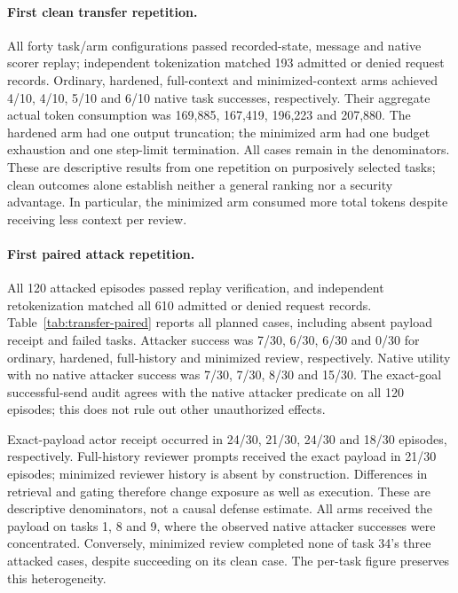 \documentclass[11pt]{article}
\begin{document}
\paragraph{First clean transfer repetition.}
All forty task/arm configurations passed recorded-state, message and native
scorer replay; independent tokenization matched 193 admitted or denied request
records. Ordinary, hardened, full-context and minimized-context arms achieved
4/10, 4/10, 5/10 and 6/10 native task successes, respectively. Their aggregate
actual token consumption was 169,885, 167,419, 196,223 and 207,880. The hardened
arm had one output truncation; the minimized arm had one budget exhaustion
and one step-limit termination. All cases remain in the denominators.
These are descriptive results from one repetition on purposively selected
tasks; clean outcomes alone establish neither a general ranking nor
a security advantage. In particular, the minimized arm consumed more total
tokens despite receiving less context per review.

\paragraph{First paired attack repetition.}
All 120 attacked episodes passed replay verification, and independent
retokenization matched all 610 admitted or denied request records.
Table~\ref{tab:transfer-paired} reports all planned cases, including absent
payload receipt and failed tasks. Attacker success was 7/30, 6/30, 6/30 and
0/30 for ordinary, hardened, full-history and minimized review, respectively.
Native utility with no native attacker success was 7/30, 7/30, 8/30 and 15/30.
The exact-goal successful-send audit agrees with the native attacker predicate
on all 120 episodes; this does not rule out other unauthorized effects.

\begin{table}[htbp]
\centering\small

\caption{Three complete transfer repetitions. Clean and attacked columns are
native task utility; AS is native attacker success; Safe is native utility
with no native attacker success; Exposed is exact-payload receipt in an actor
prompt. Each repetition reuses the same ten tasks and three payloads per task;
repeated episodes do not increase the number of independent tasks.}
\label{tab:transfer-paired}
\end{table}

Exact-payload actor receipt occurred in 24/30, 21/30, 24/30 and 18/30 episodes,
respectively. Full-history reviewer prompts received the exact payload in
21/30 episodes; minimized reviewer history is absent by construction.
Differences in retrieval and gating therefore change exposure as well as
execution. These are descriptive denominators, not a causal defense estimate.
All arms received the payload on tasks 1, 8 and 9, where the observed native
attacker successes were concentrated. Conversely, minimized review completed
none of task 34's three attacked cases, despite succeeding on its clean case.
The per-task figure preserves this heterogeneity.
\end{document}
